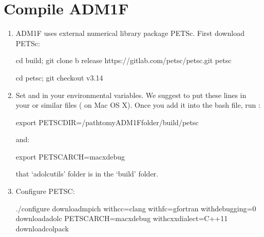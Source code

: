 \documentclass[a4paper,10pt,english]{sphinxmanual}
\begin{document}
\chapter{Compile ADM1F}
\label{\detokenize{compile:compile-adm1f}}\label{\detokenize{compile::doc}}\begin{enumerate}
%
\item {} 
\sphinxAtStartPar
ADM1F uses external numerical library package PETSc. First download PETSc:

\begin{sphinxVerbatim}[commandchars=\\\{\}]
\PYGZdl{} cd build; git clone \PYGZhy{}b release https://gitlab.com/petsc/petsc.git petsc
\end{sphinxVerbatim}

\begin{sphinxVerbatim}[commandchars=\\\{\}]
\PYGZdl{} cd petsc; git checkout v3.14
\end{sphinxVerbatim}

\item {} 
\sphinxAtStartPar
Set  and  in your environmental variables. We suggest to put these lines in your  or similar files ( on Mac OS X). Once you add it into the bash file, run :

\begin{sphinxVerbatim}[commandchars=\\\{\}]
\PYGZdl{} export PETSC\PYGZus{}DIR=/path\PYGZhy{}to\PYGZhy{}my\PYGZhy{}ADM1F\PYGZhy{}folder/build/petsc
\end{sphinxVerbatim}

\sphinxAtStartPar
and:

\begin{sphinxVerbatim}[commandchars=\\\{\}]
\PYGZdl{} export PETSC\PYGZus{}ARCH=macx\PYGZhy{}debug
\end{sphinxVerbatim}

\sphinxAtStartPar
{} that ‘adolc\sphinxhyphen{}utils’ folder is in the ‘build’ folder.

\item {} 
\sphinxAtStartPar
Configure PETSC:

\begin{sphinxVerbatim}[commandchars=\\\{\}]
\PYGZdl{} ./configure \PYGZhy{}\PYGZhy{}download\PYGZhy{}mpich \PYGZhy{}\PYGZhy{}with\PYGZhy{}cc=clang \PYGZhy{}\PYGZhy{}with\PYGZhy{}fc=gfortran \PYGZhy{}\PYGZhy{}with\PYGZhy{}debugging=0 \PYGZhy{}\PYGZhy{}download\PYGZhy{}adolc PETSC\PYGZus{}ARCH=macx\PYGZhy{}debug \PYGZhy{}\PYGZhy{}with\PYGZhy{}cxx\PYGZhy{}dialect=C++11 \PYGZhy{}\PYGZhy{}download\PYGZhy{}colpack
\end{sphinxVerbatim}

\end{enumerate}
\end{document}
